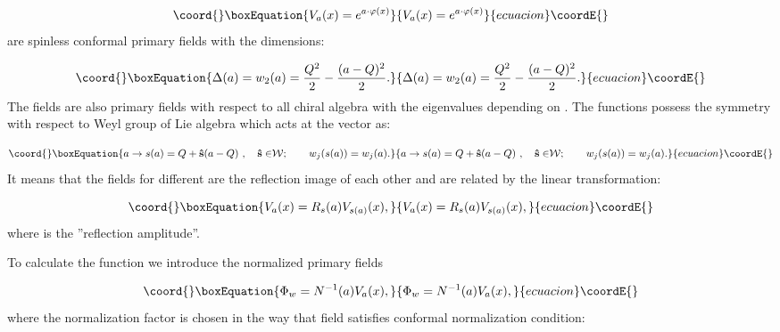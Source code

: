\documentclass[a4paper,12pt]{article}
\begin{document}
\begin{equation}\coord{}\boxEquation{
V_a(x)=e^{a\cdot \varphi (x)}  \label{ex}
}{
V_a(x)=e^{a\cdot \varphi (x)}  }{ecuacion}\coordE{}\end{equation}
are spinless conformal primary fields with the dimensions:

\begin{equation}\coord{}\boxEquation{
\Delta (a)=w_2(a)=\frac{Q^2}2-\frac{(a-Q)^2}{2}.  \label{dim}
}{
\Delta (a)=w_2(a)=\frac{Q^2}2-\frac{(a-Q)^2}{2}.  }{ecuacion}\coordE{}\end{equation}
The fields \coordHE{} are also primary fields with respect to all chiral
algebra \coordHE{} with the eigenvalues \coordHE{} depending on \coordHE{}. The functions 
\coordHE{} possess the symmetry with respect to Weyl group \coordHE{} of Lie
algebra \coordHE{} \cite{FL} which acts at the vector \coordHE{} as:

\begin{equation}\coord{}\boxEquation{
a\rightarrow s(a)=Q+{\bf \hat{s}}(a-Q){\bf \ ,\quad \hat{s}\in }{\cal W}
;\qquad w_j(s(a))=w_j(a).  \label{wg}
}{
a\rightarrow s(a)=Q+{\bf \hat{s}}(a-Q){\bf \ ,\quad \hat{s}\in }{\cal W}
;\qquad w_j(s(a))=w_j(a).  }{ecuacion}\coordE{}\end{equation}
It means that the fields \coordHE{} for different \coordHE{} 
are the reflection image of each other and are related by the linear 
transformation:

\begin{equation}\coord{}\boxEquation{
V_a(x)=R_s(a)V_{s(a)}(x),  \label{ra}
}{
V_a(x)=R_s(a)V_{s(a)}(x),  }{ecuacion}\coordE{}\end{equation}
where \coordHE{} is the ''reflection amplitude''.

To calculate the function \coordHE{} we introduce the normalized primary
fields \coordHE{}

\begin{equation}\coord{}\boxEquation{
\Phi _w=N^{-1}(a)V_a(x),  \label{no}
}{
\Phi _w=N^{-1}(a)V_a(x),  }{ecuacion}\coordE{}\end{equation}
where the normalization factor \coordHE{} is chosen in the way that field \coordHE{} satisfies conformal normalization condition:
\end{document}
